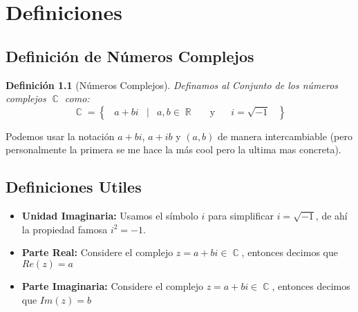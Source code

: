 \documentclass[12pt, fleqn]{report}                             %
\DeclareMathOperator \Space {\quad}                             %
\DeclareMathOperator \MiniSpace {\;}                            %
\newcommand \Such {\MiniSpace|\MiniSpace}                       %
\newcommand \Also {\Space \text{y} \Space}                      %
\newtheorem{Definition}{Definición}[section]                    %
\newcommand{\Set}[1]{\left\{ \MiniSpace #1 \MiniSpace \right\}} %
\DeclareMathOperator \Reals     {\mathbb{R}}                     %
\DeclareMathOperator \Complexs  {\mathbb{C}}                     %
\begin{document}
    \chapter{Definiciones}

        \clearpage
        \section{Definición de Números Complejos}

            \begin{Definition}[Números Complejos]
            \label{NumerosComplejos}
                Definamos al Conjunto de los números complejos $\Complexs$ como:
                \begin{equation}
                    \Complexs = 
                        \Set{ a + bi \Such a,b \in \Reals \Also i = \sqrt{-1} }
                \end{equation}

            \end{Definition}


            Podemos usar la notación $a+bi$, $a+ib$ y $(a, b)$ de manera intercambiable (pero personalmente 
            la primera se me hace la más cool pero la ultima mas concreta).


        \section{Definiciones Utiles} 

            \begin{itemize}
                \item \textbf{Unidad Imaginaria:}
                    Usamos el símbolo $i$ para simplificar $i = \sqrt{-1}$, de ahí la propiedad
                    famosa $i^2 = -1$.

                \item \textbf{Parte Real:}
                    Considere el complejo $z = a+bi \in \Complexs$, entonces decimos que $Re(z) = a$

                \item \textbf{Parte Imaginaria:}
                    Considere el complejo $z = a+bi \in \Complexs$, entonces decimos que $Im(z) = b$
            \end{itemize}
\end{document}
